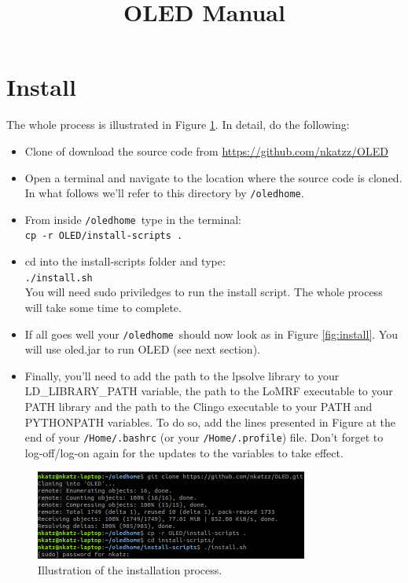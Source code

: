 \documentclass[12pt]{article}
\title{OLED Manual}
\newcommand{\home}{\texttt{/oledhome}}
\begin{document}
\maketitle

\section{Install}
The whole process is illustrated in Figure \ref{fig:terminal}. In detail, do the following:
\begin{itemize}
\item Clone of download the source code from \url{https://github.com/nkatzz/OLED} 
\item Open a terminal and navigate to the location where the source code is cloned. In what follows we'll refer to this directory by \home.
\item From inside \home \ type in the terminal: \\ \texttt{cp -r OLED/install-scripts .}
\item cd into the install-scripts folder and type:\\
\texttt{./install.sh}\\
You will need sudo priviledges to run the install script. The whole process will take some time to complete.
\item If all goes well your \home \ should now look as in Figure \ref{fig:install}. You will use \textsf{oled.jar} to run OLED (see next section).
\item Finally, you'll need to add the path to the \footnotesize \textsf{lpsolve} \normalsize library to your \linebreak \footnotesize \textsf{LD\_LIBRARY\_PATH} \normalsize  variable, the path to the \footnotesize \textsf{LoMRF} \normalsize executable to your \footnotesize \textsf{PATH} \normalsize library and the path to the \footnotesize \textsf{Clingo} \normalsize  executable to your \textsf{PATH} and \footnotesize \textsf{PYTHONPATH} \normalsize variables. To do so, add the lines presented in Figure at the end of your \texttt{/Home/.bashrc} (or your \texttt{/Home/.profile}) file. Don't forget to log-off/log-on again for the updates to the variables to take effect.

\end{itemize}




\begin{figure}[t]
\centering
\includegraphics[width=0.8\textwidth]{./figures/install}
\caption{Illustration of the installation process.}%
\label{fig:terminal}
\end{figure}
\end{document}
